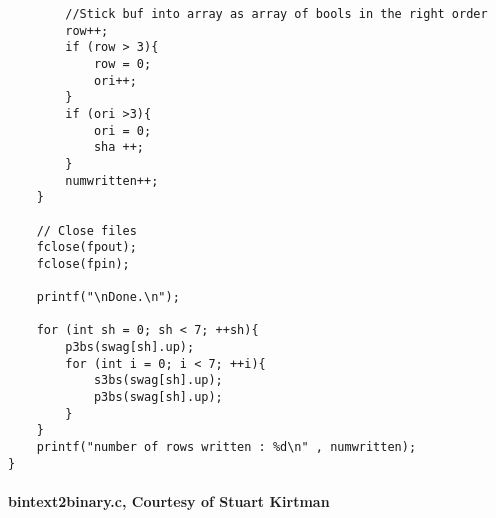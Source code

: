 \documentclass[letterpaper,titlepage,oneside]{article}
\begin{document}
\begin{lstlisting}
		//Stick buf into array as array of bools in the right order
		row++;
		if (row > 3){
			row = 0;
			ori++;
		}
		if (ori >3){
			ori = 0;
			sha ++;
		}
		numwritten++;
	}

	// Close files
	fclose(fpout);
	fclose(fpin);
	
	printf("\nDone.\n");

	for (int sh = 0; sh < 7; ++sh){
		p3bs(swag[sh].up);
		for (int i = 0; i < 7; ++i){
			s3bs(swag[sh].up);
			p3bs(swag[sh].up);
		}
	}
	printf("number of rows written : %d\n" , numwritten);
}
\end{lstlisting}


\paragraph*{bintext2binary.c, Courtesy of Stuart Kirtman\\}
\label{code: bin2bin}
\end{document}

